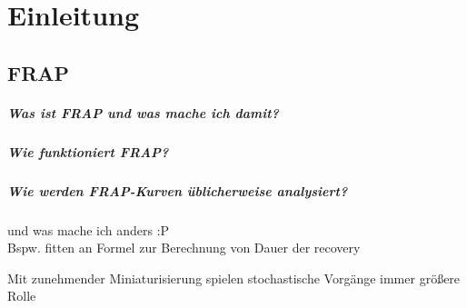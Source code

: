 \chapter{Einleitung}
\section{FRAP}
\paragraph{Was ist FRAP und was mache ich damit?}
\paragraph{Wie funktioniert FRAP?}
\paragraph{Wie werden FRAP-Kurven üblicherweise analysiert?}
und was mache ich anders :P\\
Bspw. fitten an Formel zur Berechnung von Dauer der recovery
\newline
\newline

Mit zunehmender Miniaturisierung spielen stochastische Vorgänge immer größere Rolle

